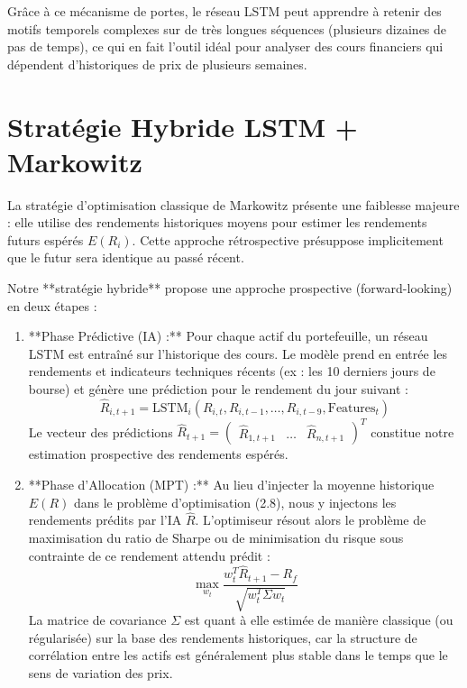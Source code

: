 Grâce à ce mécanisme de portes, le réseau LSTM peut apprendre à retenir des motifs temporels complexes sur de très longues séquences (plusieurs dizaines de pas de temps), ce qui en fait l'outil idéal pour analyser des cours financiers qui dépendent d'historiques de prix de plusieurs semaines.

\section{Stratégie Hybride LSTM + Markowitz}
La stratégie d'optimisation classique de Markowitz présente une faiblesse majeure : elle utilise des rendements historiques moyens pour estimer les rendements futurs espérés $E(R_i)$. Cette approche rétrospective présuppose implicitement que le futur sera identique au passé récent.

Notre **stratégie hybride** propose une approche prospective (forward-looking) en deux étapes :
\begin{enumerate}
    \item **Phase Prédictive (IA) :** Pour chaque actif du portefeuille, un réseau LSTM est entraîné sur l'historique des cours. Le modèle prend en entrée les rendements et indicateurs techniques récents (ex : les 10 derniers jours de bourse) et génère une prédiction pour le rendement du jour suivant :
    \begin{equation}
        \hat{R}_{i,t+1} = \text{LSTM}_i(R_{i,t}, R_{i,t-1}, \dots, R_{i,t-9}, \text{Features}_t)
    \end{equation}
    Le vecteur des prédictions $\hat{R}_{t+1} = \begin{pmatrix} \hat{R}_{1,t+1} & \dots & \hat{R}_{n,t+1} \end{pmatrix}^T$ constitue notre estimation prospective des rendements espérés.
    \item **Phase d'Allocation (MPT) :** Au lieu d'injecter la moyenne historique $E(R)$ dans le problème d'optimisation (2.8), nous y injectons les rendements prédits par l'IA $\hat{R}$. L'optimiseur résout alors le problème de maximisation du ratio de Sharpe ou de minimisation du risque sous contrainte de ce rendement attendu prédit :
    \begin{equation}
        \max_{w_t} \frac{w_t^T \hat{R}_{t+1} - R_f}{\sqrt{w_t^T \Sigma w_t}}
    \end{equation}
    La matrice de covariance $\Sigma$ est quant à elle estimée de manière classique (ou régularisée) sur la base des rendements historiques, car la structure de corrélation entre les actifs est généralement plus stable dans le temps que le sens de variation des prix.
\end{enumerate}

